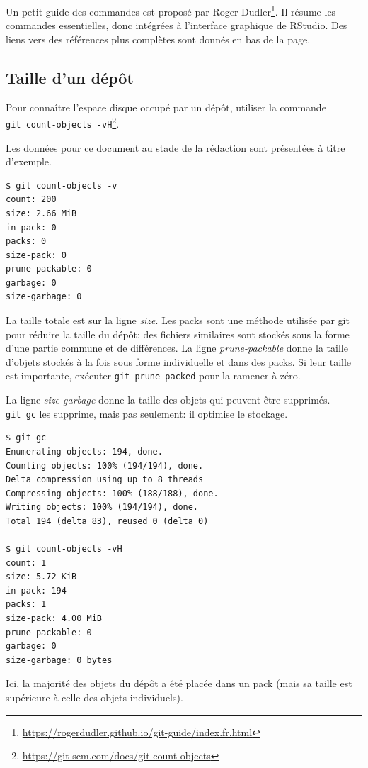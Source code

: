 \documentclass[
  12pt,
  french,
  a4paper,
  extrafontsizes,onecolumn,openright
  ]{memoir}
\newlength{\rf}
\begin{document}
Un petit guide des commandes est proposé par Roger Dudler\footnote{\url{https://rogerdudler.github.io/git-guide/index.fr.html}}.
Il résume les commandes essentielles, donc intégrées à l'interface graphique de RStudio.
Des liens vers des références plus complètes sont donnés en bas de la page.

\hypertarget{taille-dun-duxe9puxf4t}{%
\subsection{Taille d'un dépôt}\label{taille-dun-duxe9puxf4t}}

Pour connaître l'espace disque occupé par un dépôt, utiliser la commande \texttt{git\ count-objects\ -vH}\footnote{\url{https://git-scm.com/docs/git-count-objects}}.

Les données pour ce document au stade de la rédaction sont présentées à titre d'exemple.

\begin{verbatim}
$ git count-objects -v
count: 200
size: 2.66 MiB
in-pack: 0
packs: 0
size-pack: 0
prune-packable: 0
garbage: 0
size-garbage: 0
\end{verbatim}

La taille totale est sur la ligne \emph{size}.
Les packs sont une méthode utilisée par git pour réduire la taille du dépôt: des fichiers similaires sont stockés sous la forme d'une partie commune et de différences.
La ligne \emph{prune-packable} donne la taille d'objets stockés à la fois sous forme individuelle et dans des packs.
Si leur taille est importante, exécuter \texttt{git\ prune-packed} pour la ramener à zéro.

La ligne \emph{size-garbage} donne la taille des objets qui peuvent être supprimés.
\texttt{git\ gc} les supprime, mais pas seulement: il optimise le stockage.

\begin{verbatim}
$ git gc
Enumerating objects: 194, done.
Counting objects: 100% (194/194), done.
Delta compression using up to 8 threads
Compressing objects: 100% (188/188), done.
Writing objects: 100% (194/194), done.
Total 194 (delta 83), reused 0 (delta 0)

$ git count-objects -vH
count: 1
size: 5.72 KiB
in-pack: 194
packs: 1
size-pack: 4.00 MiB
prune-packable: 0
garbage: 0
size-garbage: 0 bytes
\end{verbatim}

Ici, la majorité des objets du dépôt a été placée dans un pack (mais sa taille est supérieure à celle des objets individuels).
\end{document}
